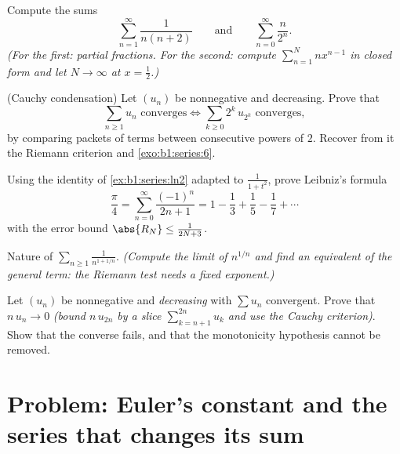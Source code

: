 \begin{exercise}[$\star\star$]\label{exo:b1:series:8}
Compute the sums
\[
\sum_{n=1}^{\infty} \frac{1}{n(n+2)}
\qquad\text{and}\qquad
\sum_{n=0}^{\infty} \frac{n}{2^n} .
\]
\emph{(For the first: partial fractions. For the second: compute
$\sum_{n=1}^{N} n x^{n-1}$ in closed form and let $N \to \infty$ at
$x = \frac12$.)}
\end{exercise}

\begin{exercise}[$\star\star\star$]\label{exo:b1:series:9}
(Cauchy condensation) Let $(u_n)$ be nonnegative and decreasing.
Prove that
\[
\sum_{n \geq 1} u_n \text{ converges}
\iff
\sum_{k \geq 0} 2^k\, u_{2^k} \text{ converges},
\]
by comparing packets of terms between consecutive powers of $2$.
Recover from it the Riemann criterion and
\cref{exo:b1:series:6}.
\end{exercise}

\begin{exercise}[$\star\star\star$]\label{exo:b1:series:10}
Using the  identity of \cref{ex:b1:series:ln2} adapted to
$\frac{1}{1+t^2}$, prove Leibniz's formula
\[
\frac{\pi}{4} = \sum_{n=0}^{\infty} \frac{(-1)^n}{2n+1}
= 1 - \frac13 + \frac15 - \frac17 + \cdots
\]
with the error bound $\abs{R_N} \leq \frac{1}{2N+3}$.
\end{exercise}

\begin{exercise}[$\star\star$]\label{exo:b1:series:11}
Nature of $\displaystyle\sum_{n \geq 1} \frac{1}{n^{1 + 1/n}}$.
\emph{(Compute the limit of $n^{1/n}$ and find an equivalent of
the general term: the Riemann test needs a \emph{fixed}
exponent.)}
\end{exercise}

\begin{exercise}[$\star\star\star$]\label{exo:b1:series:12}
Let $(u_n)$ be nonnegative and \emph{decreasing} with $\sum u_n$
convergent. Prove that $n\,u_n \to 0$ \emph{(bound $n\,u_{2n}$
by a slice $\sum_{k=n+1}^{2n} u_k$ and use the Cauchy
criterion)}. Show that the converse fails, and that the
monotonicity hypothesis cannot be removed.
\end{exercise}

\section{Problem: Euler's constant and the series that changes
its sum}

